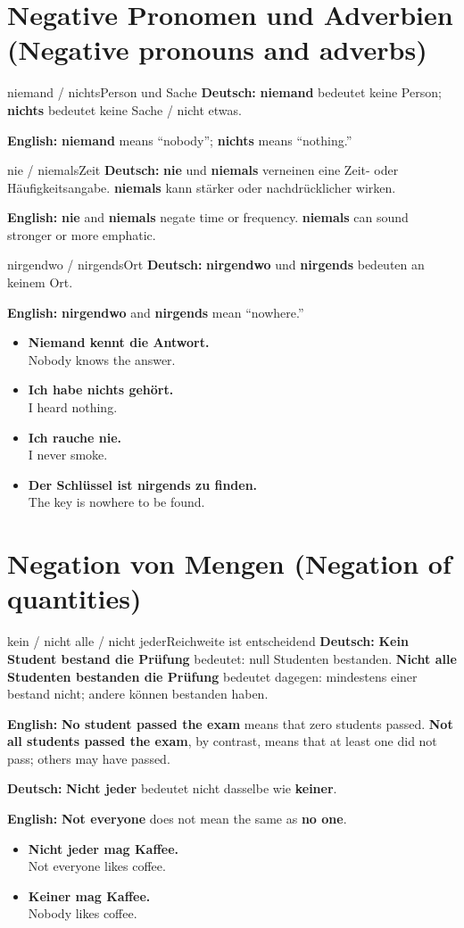 \documentclass[a4paper,11pt]{article}
\newcommand{\GermanText}[1]{\textbf{Deutsch: }#1\par}
\newcommand{\EnglishText}[1]{{\small\color{SoftGray}\textbf{English: }#1\par}}
\newcommand{\ExampleItem}[2]{\item \textbf{#1}\\{\small\color{SoftGray}#2}}
\begin{document}
\section{Negative Pronomen und Adverbien \textnormal{(Negative pronouns and adverbs)}}
\begin{grammarentry}{niemand / nichts}{Person und Sache}
\GermanText{\textbf{niemand} bedeutet \glqq keine Person\grqq; \textbf{nichts} bedeutet \glqq keine Sache / nicht etwas\grqq.}
\EnglishText{\textbf{niemand} means ``nobody''; \textbf{nichts} means ``nothing.''}
\end{grammarentry}
\begin{grammarentry}{nie / niemals}{Zeit}
\GermanText{\textbf{nie} und \textbf{niemals} verneinen eine Zeit- oder Häufigkeitsangabe. \textbf{niemals} kann stärker oder nachdrücklicher wirken.}
\EnglishText{\textbf{nie} and \textbf{niemals} negate time or frequency. \textbf{niemals} can sound stronger or more emphatic.}
\end{grammarentry}
\begin{grammarentry}{nirgendwo / nirgends}{Ort}
\GermanText{\textbf{nirgendwo} und \textbf{nirgends} bedeuten \glqq an keinem Ort\grqq.}
\EnglishText{\textbf{nirgendwo} and \textbf{nirgends} mean ``nowhere.''}
\end{grammarentry}
\begin{exbox}\begin{itemize}
\ExampleItem{Niemand kennt die Antwort.}{Nobody knows the answer.}
\ExampleItem{Ich habe nichts gehört.}{I heard nothing.}
\ExampleItem{Ich rauche nie.}{I never smoke.}
\ExampleItem{Der Schlüssel ist nirgends zu finden.}{The key is nowhere to be found.}
\end{itemize}\end{exbox}

\section{Negation von Mengen \textnormal{(Negation of quantities)}}
\begin{grammarentry}{kein / nicht alle / nicht jeder}{Reichweite ist entscheidend}
\GermanText{\textbf{Kein Student bestand die Prüfung} bedeutet: null Studenten bestanden. \textbf{Nicht alle Studenten bestanden die Prüfung} bedeutet dagegen: mindestens einer bestand nicht; andere können bestanden haben.}
\EnglishText{\textbf{No student passed the exam} means that zero students passed. \textbf{Not all students passed the exam}, by contrast, means that at least one did not pass; others may have passed.}
\GermanText{\textbf{Nicht jeder} bedeutet nicht dasselbe wie \textbf{keiner}.}
\EnglishText{\textbf{Not everyone} does not mean the same as \textbf{no one}.}
\end{grammarentry}
\begin{exbox}\begin{itemize}
\ExampleItem{Nicht jeder mag Kaffee.}{Not everyone likes coffee.}
\ExampleItem{Keiner mag Kaffee.}{Nobody likes coffee.}
\end{itemize}\end{exbox}
\end{document}
